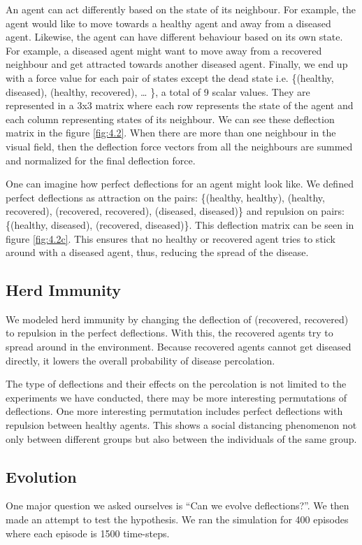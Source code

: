 \documentclass[a4paper,11pt]{article}
\begin{document}
    An agent can act differently based on the state of its neighbour. For example, the agent would like to move towards a healthy agent and away from a diseased agent. Likewise, the agent can have different behaviour based on its own state. For example, a diseased agent might want to move away from a recovered neighbour and get attracted towards another diseased agent. Finally, we end up with a force value for each pair of states except the dead state i.e. \{(healthy, diseased), (healthy, recovered), … \}, a total of 9 scalar values. They are represented in a 3x3 matrix where each row represents the state of the agent and each column representing states of its neighbour. We can see these deflection matrix in the figure \ref{fig:4.2}. When there are more than one neighbour in the visual field, then the deflection force vectors from all the neighbours are summed and normalized for the final deflection force.

    One can imagine how perfect deflections for an agent might look like. We defined perfect deflections as attraction on the pairs: \{(healthy, healthy), (healthy, recovered), (recovered, recovered), (diseased, diseased)\} and repulsion on pairs: \{(healthy, diseased), (recovered, diseased)\}. This deflection matrix can be seen in figure \ref{fig:4.2c}. This ensures that no healthy or recovered agent tries to stick around with a diseased agent, thus, reducing the spread of the disease.

    \subsection{Herd Immunity}
    We modeled herd immunity \cite{herdImm} by changing the deflection of (recovered, recovered) to repulsion in the perfect deflections. With this, the recovered agents try to spread around in the environment. Because recovered agents cannot get diseased directly, it lowers the overall probability of disease percolation.

    The type of deflections and their effects on the percolation is not limited to the experiments we have conducted, there may be more interesting permutations of deflections. One more interesting permutation includes perfect deflections with repulsion between healthy agents. This shows a social distancing phenomenon not only between different groups but also between the individuals of the same group.

    \subsection{Evolution}
    One major question we asked ourselves is “Can we evolve deflections?”. We then made an attempt to test the hypothesis. We ran the simulation for 400 episodes where each episode is 1500 time-steps.
\end{document}
